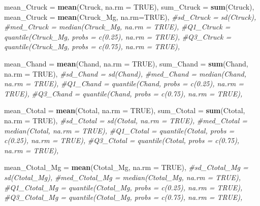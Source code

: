 \documentclass[
]{article}
\newenvironment{Shaded}{\begin{snugshade}}{\end{snugshade}}
\newcommand{\AttributeTok}[1]{\textcolor[rgb]{0.13,0.29,0.53}{#1}}
\newcommand{\CommentTok}[1]{\textcolor[rgb]{0.56,0.35,0.01}{\textit{#1}}}
\newcommand{\ConstantTok}[1]{\textcolor[rgb]{0.56,0.35,0.01}{#1}}
\newcommand{\FunctionTok}[1]{\textcolor[rgb]{0.13,0.29,0.53}{\textbf{#1}}}
\newcommand{\NormalTok}[1]{#1}
\begin{document}
\begin{Shaded}
\begin{Highlighting}[]
            \AttributeTok{mean\_Ctruck =} \FunctionTok{mean}\NormalTok{(Ctruck, }\AttributeTok{na.rm =} \ConstantTok{TRUE}\NormalTok{),}
            \AttributeTok{sum\_Ctruck =} \FunctionTok{sum}\NormalTok{(Ctruck),}
            \AttributeTok{mean\_Ctruck =} \FunctionTok{mean}\NormalTok{(Ctruck\_Mg, }\AttributeTok{na.rm=}\ConstantTok{TRUE}\NormalTok{),}
            \CommentTok{\#sd\_Ctruck = sd(Ctruck),}
            \CommentTok{\#med\_Ctruck = median(Ctruck\_Mg, na.rm = TRUE),}
            \CommentTok{\#Q1\_Ctruck = quantile(Ctruck\_Mg, probs = c(0.25), na.rm = TRUE),}
            \CommentTok{\#Q3\_Ctruck = quantile(Ctruck\_Mg, probs = c(0.75), na.rm = TRUE),}
            
            \AttributeTok{mean\_Chand =} \FunctionTok{mean}\NormalTok{(Chand, }\AttributeTok{na.rm =} \ConstantTok{TRUE}\NormalTok{),}
            \AttributeTok{sum\_Chand =} \FunctionTok{sum}\NormalTok{(Chand, }\AttributeTok{na.rm =} \ConstantTok{TRUE}\NormalTok{),}
            \CommentTok{\#sd\_Chand = sd(Chand),}
            \CommentTok{\#med\_Chand = median(Chand, na.rm = TRUE),}
            \CommentTok{\#Q1\_Chand = quantile(Chand, probs = c(0.25), na.rm = TRUE),}
            \CommentTok{\#Q3\_Chand = quantile(Chand, probs = c(0.75), na.rm = TRUE),}
            
            \AttributeTok{mean\_Ctotal =} \FunctionTok{mean}\NormalTok{(Ctotal, }\AttributeTok{na.rm =} \ConstantTok{TRUE}\NormalTok{),}
            \AttributeTok{sum\_Ctotal =} \FunctionTok{sum}\NormalTok{(Ctotal, }\AttributeTok{na.rm =} \ConstantTok{TRUE}\NormalTok{),}
            \CommentTok{\#sd\_Ctotal = sd(Ctotal, na.rm = TRUE),}
            \CommentTok{\#med\_Ctotal = median(Ctotal, na.rm = TRUE),}
            \CommentTok{\#Q1\_Ctotal = quantile(Ctotal, probs = c(0.25), na.rm = TRUE),}
            \CommentTok{\#Q3\_Ctotal = quantile(Ctotal, probs = c(0.75), na.rm = TRUE),}
           
            \AttributeTok{mean\_Ctotal\_Mg =} \FunctionTok{mean}\NormalTok{(Ctotal\_Mg, }\AttributeTok{na.rm =} \ConstantTok{TRUE}\NormalTok{),}
            \CommentTok{\#sd\_Ctotal\_Mg = sd(Ctotal\_Mg),}
            \CommentTok{\#med\_Ctotal\_Mg = median(Ctotal\_Mg, na.rm = TRUE),}
            \CommentTok{\#Q1\_Ctotal\_Mg = quantile(Ctotal\_Mg, probs = c(0.25), na.rm = TRUE),}
            \CommentTok{\#Q3\_Ctotal\_Mg = quantile(Ctotal\_Mg, probs = c(0.75), na.rm = TRUE),}
            

\end{Highlighting}
\end{Shaded}
\end{document}
